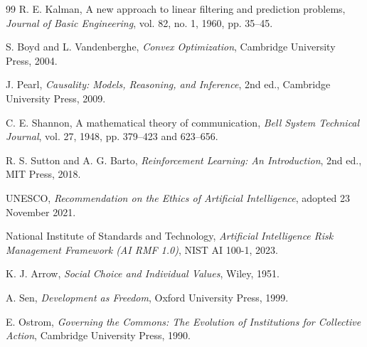 \documentclass[11pt,a4paper]{article}
\begin{document}
\begin{thebibliography}{99}
R. E. Kalman,
\newblock A new approach to linear filtering and prediction problems,
\newblock \emph{Journal of Basic Engineering}, vol. 82, no. 1, 1960, pp. 35--45.

S. Boyd and L. Vandenberghe,
\newblock \emph{Convex Optimization},
\newblock Cambridge University Press, 2004.

J. Pearl,
\newblock \emph{Causality: Models, Reasoning, and Inference}, 2nd ed.,
\newblock Cambridge University Press, 2009.

C. E. Shannon,
\newblock A mathematical theory of communication,
\newblock \emph{Bell System Technical Journal}, vol. 27, 1948, pp. 379--423 and 623--656.

R. S. Sutton and A. G. Barto,
\newblock \emph{Reinforcement Learning: An Introduction}, 2nd ed.,
\newblock MIT Press, 2018.

UNESCO,
\newblock \emph{Recommendation on the Ethics of Artificial Intelligence},
\newblock adopted 23 November 2021.

National Institute of Standards and Technology,
\newblock \emph{Artificial Intelligence Risk Management Framework (AI RMF 1.0)},
\newblock NIST AI 100-1, 2023.

K. J. Arrow,
\newblock \emph{Social Choice and Individual Values},
\newblock Wiley, 1951.

A. Sen,
\newblock \emph{Development as Freedom},
\newblock Oxford University Press, 1999.

E. Ostrom,
\newblock \emph{Governing the Commons: The Evolution of Institutions for Collective Action},
\newblock Cambridge University Press, 1990.

\end{thebibliography}
\end{document}
